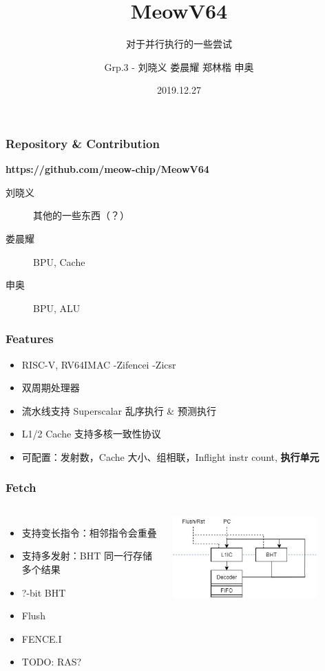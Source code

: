 \documentclass[UTF-8]{ctexbeamer}
\title{MeowV64}
\subtitle{对于并行执行的一些尝试}
\author{Grp.3 - 刘晓义\hspace{.2em} 娄晨耀 \hspace{.2em} 郑林楷 \hspace{.2em} 申奥}
\date{2019.12.27}
\begin{document}
\begin{frame}
  \titlepage
\end{frame}
\begin{frame}
  \frametitle{Repository \& Contribution}

  \textbf{https://github.com/meow-chip/MeowV64}

  \vspace{1em}

  \begin{description}
    \item[刘晓义] 其他的一些东西（？）
    \item[娄晨耀] BPU, Cache
    \item[申奥] BPU, ALU
  \end{description}
\end{frame}
\begin{frame}
  \frametitle{Features}

  \begin{itemize}
    \item RISC-V, RV64IMAC -Zifencei -Zicsr
    \item 双周期处理器
    \pause
    \item 流水线支持 Superscalar 乱序执行 \& 预测执行
    \item L1/2 Cache 支持多核一致性协议
    \item 可配置：发射数，Cache 大小、组相联，Inflight instr count, \textbf{执行单元}
  \end{itemize}
\end{frame}

\begin{frame}
  \frametitle{Fetch}

  \begin{columns}
    \begin{itemize}
      \item 支持变长指令：相邻指令会重叠
      \item 支持多发射：BHT 同一行存储多个结果
      \item ?-bit BHT
      \item Flush
      \item FENCE.I
      \item TODO: RAS?
    \end{itemize}
    \begin{center}
      \includegraphics[width=0.8\textwidth]{assets/fetch.jpg}
    \end{center}
  \end{columns}
\end{frame}
\end{document}
